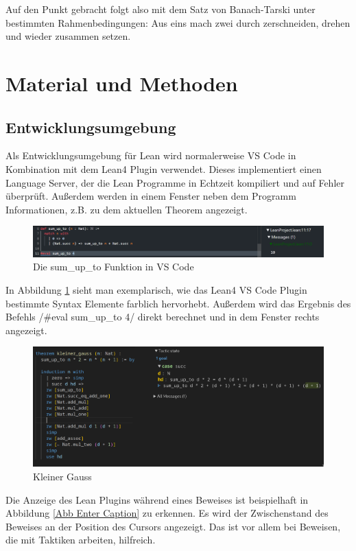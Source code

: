 \documentclass[10pt]{article}
\begin{document}
\noindent Auf den Punkt gebracht folgt also mit dem Satz von Banach-Tarski unter bestimmten Rahmenbedingungen: \glqq Aus eins mach zwei durch zerschneiden, drehen und wieder zusammen setzen\grqq.


\section{Material und Methoden}

\subsection{Entwicklungsumgebung}
Als Entwicklungsumgebung für Lean wird normalerweise VS Code in Kombination mit dem Lean4 Plugin \cite{Q3} verwendet. Dieses implementiert einen Language Server, der die Lean Programme in Echtzeit kompiliert und auf Fehler überprüft. Außerdem werden in einem Fenster neben dem Programm Informationen, z.B. zu dem aktuellen Theorem angezeigt.
\begin{figure}[H]
    \centering
    \includegraphics[width=0.95\linewidth]{Abbildung sum_up_to.png}
    \caption{Die sum\_up\_to Funktion in VS Code}
    \label{Abb sum_up_to}
\end{figure}
\vspace{-0.2cm}
\noindent In Abbildung \ref{Abb sum_up_to} sieht man exemplarisch, wie das Lean4 VS Code Plugin bestimmte Syntax Elemente farblich hervorhebt. Außerdem wird das Ergebnis des Befehls \lean/#eval sum_up_to 4/ direkt berechnet und in dem Fenster rechts angezeigt.
\vspace{-0.2cm}
\hspace{-0.4cm}
\begin{figure}[H]
    \centering
    \includegraphics[width=0.65\linewidth]{kleiner_gauss.png}
    \caption{Kleiner Gauss}
    \label{kleiner gauss}
\end{figure}
\noindent Die Anzeige des Lean Plugins während eines Beweises ist beispielhaft in Abbildung \ref{Abb Enter Caption} zu erkennen. Es wird der Zwischenstand des Beweises an der Position des Cursors angezeigt. Das ist vor allem bei Beweisen, die mit Taktiken arbeiten, hilfreich.
\end{document}
